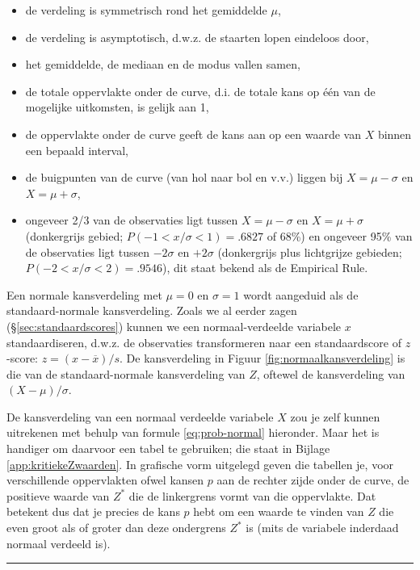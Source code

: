 \documentclass[
]{book}
\begin{document}
\begin{itemize}
\item
  de verdeling is symmetrisch rond het gemiddelde \(\mu\),
\item
  de verdeling is asymptotisch, d.w.z. de staarten lopen eindeloos
  door,
\item
  het gemiddelde, de mediaan en de modus vallen samen,
\item
  de totale oppervlakte onder de curve, d.i. de totale kans op één van
  de mogelijke uitkomsten, is gelijk aan 1,
\item
  de oppervlakte onder de curve geeft de kans aan op een waarde van \(X\) binnen een bepaald interval,
\item
  de buigpunten van de curve (van hol naar bol en v.v.) liggen bij
  \(X=\mu-\sigma\) en \(X=\mu+\sigma\),
\item
  ongeveer 2/3 van de observaties ligt
  tussen \(X=\mu-\sigma\) en \(X=\mu+\sigma\) (donkergrijs gebied;
  \(P(-1<x/\sigma<1)=.6827\) of 68\%) en ongeveer 95\% van de observaties ligt
  tussen \(-2\sigma\) en \(+2\sigma\) (donkergrijs plus lichtgrijze
  gebieden; \(P(-2<x/\sigma<2)=.9546\)), dit staat bekend als de
  Empirical Rule.
\end{itemize}

Een normale kansverdeling met \(\mu=0\) en \(\sigma=1\) wordt aangeduid als
de standaard-normale kansverdeling. Zoals we al eerder zagen
(§\ref{sec:standaardscores}) kunnen we een normaal-verdeelde
variabele \(x\) standaardiseren, d.w.z. de observaties transformeren naar
een standaardscore of \(z\)-score: \(z = (x-\overline{x})/s\).
De kansverdeling in
Figuur \ref{fig:normaalkansverdeling} is die van de standaard-normale
kansverdeling van \(Z\), oftewel de kansverdeling van \((X-\mu)/\sigma\).

De kansverdeling van een normaal verdeelde variabele \(X\) zou je zelf
kunnen uitrekenen met behulp van formule
\eqref{eq:prob-normal} hieronder. Maar het is handiger om daarvoor
een tabel te gebruiken; die staat in
Bijlage \ref{app:kritiekeZwaarden}.
In grafische vorm uitgelegd geven die tabellen je,
voor verschillende oppervlakten ofwel kansen \(p\) aan de rechter zijde onder de curve,
de positieve waarde van \(Z^*\) die de linkergrens vormt
van die oppervlakte. Dat betekent dus dat je precies de kans \(p\) hebt om
een waarde te vinden van \(Z\) die even groot als of groter dan deze
ondergrens \(Z^*\) is (mits de variabele inderdaad normaal verdeeld is).

\begin{center}\rule{0.5\linewidth}{0.5pt}\end{center}
\end{document}
